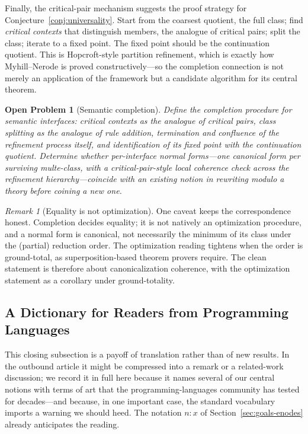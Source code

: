 \documentclass[sigconf,nonacm]{acmart}
\theoremstyle{definition}
\theoremstyle{plain}
\newtheorem{openproblem}[definition]{Open Problem}
\theoremstyle{remark}
\newtheorem{remark}[definition]{Remark}
\begin{document}
Finally, the critical-pair mechanism suggests the proof strategy for
Conjecture~\ref{conj:universality}.  Start from the coarsest
quotient, the full class; find \emph{critical contexts} that
distinguish members, the analogue of critical pairs; split the
class; iterate to a fixed point.  The fixed point should be the
continuation quotient.  This is Hopcroft-style partition refinement,
which is exactly how Myhill--Nerode is proved constructively---so
the completion connection is not merely an application of the
framework but a candidate algorithm for its central theorem.

\begin{openproblem}[Semantic completion]
\label{open:completion}
Define the completion procedure for semantic interfaces: critical
contexts as the analogue of critical pairs, class splitting as the
analogue of rule addition, termination and confluence of the
refinement process itself, and identification of its fixed point
with the continuation quotient.  Determine whether per-interface
normal forms---one canonical form per surviving multe-class, with a
critical-pair-style local coherence check across the refinement
hierarchy---coincide with an existing notion in rewriting modulo a
theory before coining a new one.
\end{openproblem}

\begin{remark}[Equality is not optimization]
One caveat keeps the correspondence honest.  Completion decides
equality; it is not natively an optimization procedure, and a normal
form is canonical, not necessarily the minimum of its class under
the (partial) reduction order.  The optimization reading tightens
when the order is ground-total, as superposition-based theorem
provers require.  The clean statement is therefore about
canonicalization coherence, with the optimization statement as a
corollary under ground-totality.
\end{remark}

\subsection{A Dictionary for Readers from Programming Languages}
\label{sec:types}

This closing subsection is a payoff of translation rather than of
new results.  In the outbound article it might be compressed into a
remark or a related-work discussion; we record it in full here
because it names several of our central notions with terms of art
that the programming-languages community has tested for
decades---and because, in one important case, the standard
vocabulary imports a warning we should heed.  The notation \(n:x\)
of Section~\ref{sec:goals-enodes} already anticipates the reading.
\end{document}
